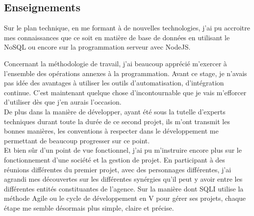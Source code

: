 \documentclass{report}
\newcommand{\jumpOne}{\\[1\baselineskip]}
\begin{document}
\subsection{Enseignements}
Sur le plan technique, en me formant à de nouvelles technologies, j'ai pu accroitre mes connaissances que ce soit en matière de base de données en utilisant le NoSQL ou encore sur la programmation serveur avec NodeJS.

Concernant la méthodologie de travail, j'ai beaucoup apprécié m'exercer à l'ensemble des opérations annexes à la programmation. Avant ce stage, je n'avais pas idée des avantages à utiliser les outils d'automatisation, d'intégration continue. C'est maintenant quelque chose d'incontournable que je vais m'efforcer d'utiliser dès que j'en aurais l'occasion.
\jumpOne 
De plus dans la manière de développer, ayant été sous la tutelle d'experts techniques durant toute la durée de ce second projet, ils m'ont transmit les bonnes manières, les conventions à respecter dans le développement me permettant de beaucoup progresser sur ce point.
\jumpOne
Et bien sûr d'un point de vue fonctionnel, j'ai pu m'instruire encore plus sur le fonctionnement d'une société et la gestion de projet. En participant à des réunions différentes du premier projet, avec des personnages différentes, j'ai agrandi mes découvertes sur les différentes synérgies qu'il peut y avoir entre les différentes entités constituantes de l'agence. Sur la manière dont SQLI utilise la méthode Agile ou le cycle de développement en V pour gérer ses projets, chaque étape me semble désormais plus simple, claire et précise.


\end{document}
